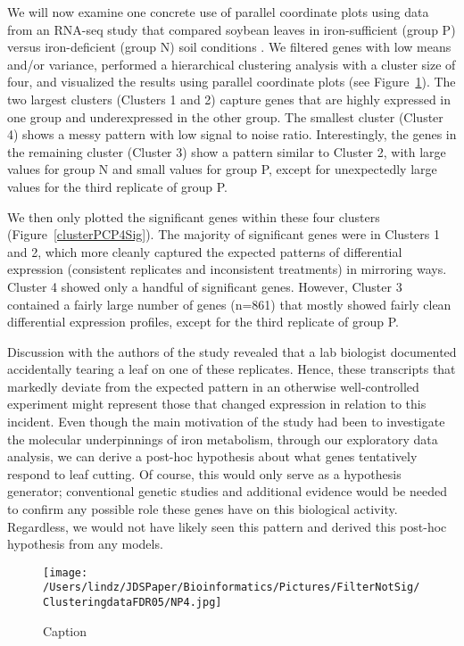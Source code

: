 \documentclass{bioinfo}
\begin{document}
We will now examine one concrete use of parallel coordinate plots using data from an RNA-seq study that compared soybean leaves in iron-sufficient (group P) versus iron-deficient (group N) soil conditions \citep{Lauter}. We filtered genes with low means and/or variance, performed a hierarchical clustering analysis with a cluster size of four, and visualized the results using parallel coordinate plots (see Figure~\ref{clusterPCP4}). The two largest clusters (Clusters 1 and 2) capture genes that are highly expressed in one group and underexpressed in the other group. The smallest cluster (Cluster 4) shows a messy pattern with low signal to noise ratio. Interestingly, the genes in the remaining cluster (Cluster 3) show a pattern similar to Cluster 2, with large values for group N and small values for group P, except for unexpectedly large values for the third replicate of group P. 

We then only plotted the significant genes within these four clusters (Figure~\ref{clusterPCP4Sig}). The majority of significant genes were in Clusters 1 and 2, which more cleanly captured the expected patterns of differential expression (consistent replicates and inconsistent treatments) in mirroring ways. Cluster 4 showed only a handful of significant genes. However, Cluster 3 contained a fairly large number of genes (n=861) that mostly showed fairly clean differential expression profiles, except for the third replicate of group P.

Discussion with the authors of the study revealed that a lab biologist documented accidentally tearing a leaf on one of these replicates. Hence, these transcripts that markedly deviate from the expected pattern in an otherwise well-controlled experiment might represent those that changed expression in relation to this incident. Even though the main motivation of the study had been to investigate the molecular underpinnings of iron metabolism, through our exploratory data analysis, we can derive a post-hoc hypothesis about what genes tentatively respond to leaf cutting. Of course, this would only serve as a hypothesis generator; conventional genetic studies and additional evidence would be needed to confirm any possible role these genes have on this biological activity. Regardless, we would not have likely seen this pattern and derived this post-hoc hypothesis from any models.

\begin{figure}[!tpb]
\centerline{\texttt{[image: /Users/lindz/JDSPaper/Bioinformatics/Pictures/FilterNotSig/ClusteringdataFDR05/NP4.jpg]}}
\caption{Caption
\label{clusterPCP4}}
\end{figure}
\end{document}
